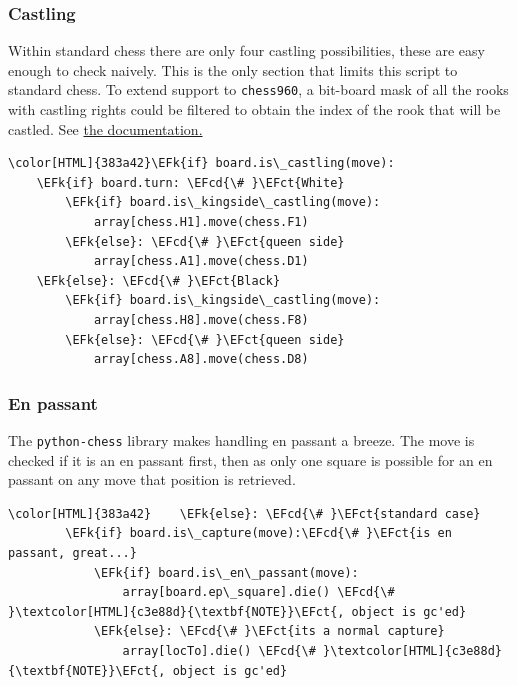 \documentclass[11pt]{article}
\newcommand{\EFk}[1]{\textcolor{EFk}{#1}} %
\newcommand{\EFct}[1]{\textcolor{EFct}{#1}} %
\newcommand{\EFcd}[1]{\textcolor{EFcd}{#1}} %
\begin{document}
\subsubsection{Castling}
\label{sec:orge6d1799}
Within standard chess there are only four castling possibilities, these are easy
enough to check naively. This is the only section that limits this script to
standard chess. To extend support to \texttt{chess960}, a bit-board mask of all the
rooks with castling rights could be filtered to obtain the index of the rook
that will be castled. See \href{https://python-chess.readthedocs.io/en/latest/core.html?highlight=castl\#chess.Board.castling\_rights}{the documentation.}
\begin{Code}
\begin{Verbatim}[]
\color[HTML]{383a42}\EFk{if} board.is\_castling(move):
    \EFk{if} board.turn: \EFcd{\# }\EFct{White}
        \EFk{if} board.is\_kingside\_castling(move):
            array[chess.H1].move(chess.F1)
        \EFk{else}: \EFcd{\# }\EFct{queen side}
            array[chess.A1].move(chess.D1)
    \EFk{else}: \EFcd{\# }\EFct{Black}
        \EFk{if} board.is\_kingside\_castling(move):
            array[chess.H8].move(chess.F8)
        \EFk{else}: \EFcd{\# }\EFct{queen side}
            array[chess.A8].move(chess.D8)
\end{Verbatim}
\end{Code}
\subsubsection{En passant}
\label{sec:org6c3120c}
The \texttt{python-chess} library makes handling en passant a breeze. The move is
checked if it is an en passant first, then as only one square is possible for an
en passant on any move that position is retrieved.
\begin{Code}
\begin{Verbatim}[]
\color[HTML]{383a42}    \EFk{else}: \EFcd{\# }\EFct{standard case}
        \EFk{if} board.is\_capture(move):\EFcd{\# }\EFct{is en passant, great...}
            \EFk{if} board.is\_en\_passant(move):
                array[board.ep\_square].die() \EFcd{\# }\textcolor[HTML]{c3e88d}{\textbf{NOTE}}\EFct{, object is gc'ed}
            \EFk{else}: \EFcd{\# }\EFct{its a normal capture}
                array[locTo].die() \EFcd{\# }\textcolor[HTML]{c3e88d}{\textbf{NOTE}}\EFct{, object is gc'ed}
\end{Verbatim}
\end{Code}
\end{document}

